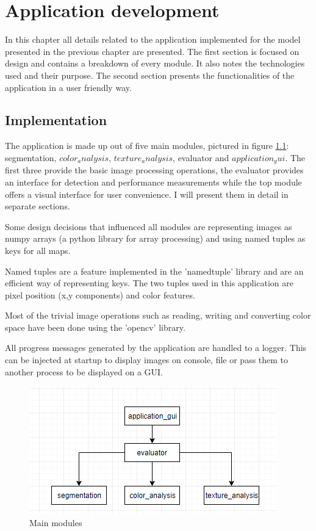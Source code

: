 \documentclass[12pt]{report}
\begin{document}
	\chapter{Application development}
	In this chapter all details related to the application implemented for the model presented in the previous chapter are presented. The first section is focused on design and contains a breakdown of every module. It also notes the technologies used and their purpose. The second section presents the functionalities of the application in a user friendly way.
	
	\section{Implementation}
	The application is made up out of five main modules, pictured in figure \ref{fig:main_modules}: segmentation, $color_analysis$, $texture_analysis$, evaluator and $application_gui$. The first three provide the basic image processing operations, the evaluator provides an interface for detection and performance measurements while the top module offers a visual interface for user convenience. I will present them in detail in separate sections.
	
	Some design decisions that influenced all modules are representing images as numpy arrays (a python library for array processing) and using named tuples as keys for all maps. 
	
	Named tuples are a feature implemented in the 'namedtuple' library and are an efficient way of representing keys. The two tuples used in this application are pixel position (x,y components) and color features.
	
	Most of the trivial image operations such as reading, writing and converting color space have been done using the 'opencv' library.
	
	All progress messages generated by the application are handled to a logger. This can be injected at startup to display images on console, file or pass them to another process to be displayed on a GUI.
	
	\begin{figure}[h!]
		\centering
		\includegraphics[]{design/main_modules.png}
		\caption{Main modules}
		\label{fig:main_modules}
	\end{figure}
\end{document}
